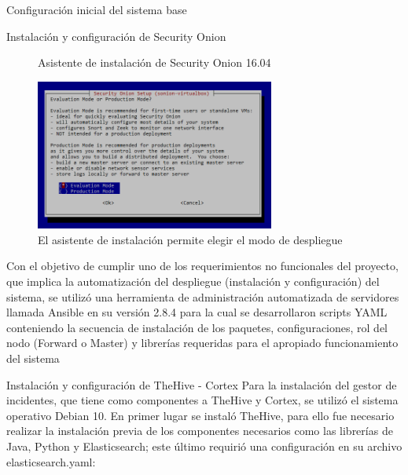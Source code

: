 \begin{section}{Configuración inicial del sistema base}
\begin{subsection}{Instalación y configuración de Security Onion}
\begin{figure}[H]
            \caption{Asistente de instalación de Security Onion 16.04}
            \label{fig:figura_37_sonion_conf}
        \end{figure}
        \begin{figure}[H]
            \centering
            \includegraphics[width=0.7\textwidth]{./iteracion_2_imagenes/figura_38_sonion_modo.png}
            \caption{El asistente de instalación permite elegir el modo de despliegue}
            \label{fig:figura_38_sonion_modo}
        \end{figure}
        Con el objetivo de cumplir uno de los requerimientos no funcionales del proyecto, que implica la automatización del despliegue (instalación y configuración) del sistema, se utilizó una herramienta de administración automatizada de servidores llamada Ansible en su versión 2.8.4 para la cual se desarrollaron scripts YAML conteniendo la secuencia de instalación de los paquetes, configuraciones, rol del nodo (Forward o Master) y librerías requeridas para el apropiado funcionamiento del sistema
        \end{subsection}
        \begin{subsection}{Instalación y configuración de TheHive - Cortex}
        Para la instalación del gestor de incidentes, que tiene como componentes a  TheHive y Cortex, se utilizó  el sistema operativo Debian 10. En primer lugar se instaló TheHive, para ello fue necesario realizar la instalación previa de los componentes necesarios como las librerías de Java, Python y Elasticsearch; este último requirió una configuración en su archivo elasticsearch.yaml:
        

\end{subsection}
\end{section}
